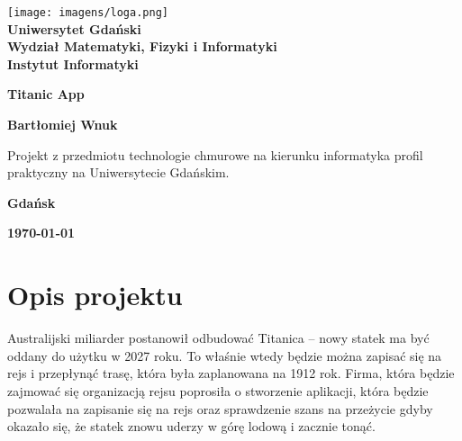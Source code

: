 \documentclass[12pt,a4paper]{article}
\newcommand{\hmwkTitle}{Titanic App} %
\newcommand{\hmwkDueDate}{\today} %
\newcommand{\hmwkAuthorName}{Bartłomiej Wnuk} %
\begin{document}
\begin{titlepage}
    \vfill
	\begin{center}
	\hspace*{-1cm}
	\vspace*{0.5cm}
    \texttt{[image: imagens/loga.png]}\\
	\textbf{Uniwersytet Gdański \\ [0.05cm]Wydział Matematyki, Fizyki i Informatyki \\ [0.05cm] Instytut Informatyki}

	\vspace{0.6cm}
	\vspace{4cm}
	{\huge \textbf{\hmwkTitle}}\vspace{8mm}
	
	{\large \textbf{\hmwkAuthorName}}\\[3cm]
	
		\hspace{.45\textwidth} %
	   \begin{minipage}{.5\textwidth}
	   Projekt z przedmiotu technologie chmurowe na kierunku informatyka profil praktyczny na Uniwersytecie Gdańskim.\\[0.1cm]
	  \end{minipage}
	  \vfill
	
	\textbf{Gdańsk}
	
	\textbf{\hmwkDueDate}
	\end{center}
	
\end{titlepage}

\newpage
\setcounter{secnumdepth}{5}
\tableofcontents
\newpage

\section{Opis projektu}
\label{sec:Project}
Australijski miliarder postanowił odbudować Titanica – nowy statek ma być oddany do użytku w 2027 roku. To właśnie wtedy będzie można zapisać się na rejs i przepłynąć trasę, która była zaplanowana na 1912 rok. Firma, która będzie zajmować się organizacją rejsu poprosiła o stworzenie aplikacji, która będzie pozwalała na zapisanie się na rejs oraz sprawdzenie szans na przeżycie gdyby okazało się, że statek znowu uderzy w górę lodową i zacznie tonąć.
\end{document}
